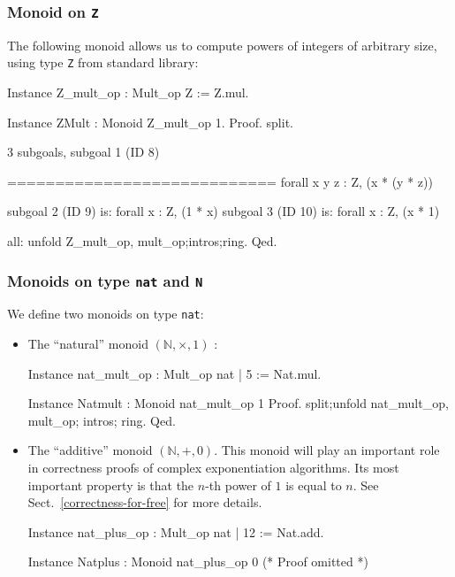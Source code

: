 \subsubsection{Monoid on \texttt{Z}}
The following monoid allows us to compute powers of integers of arbitrary size, 
using type \texttt{Z} from standard library:

\begin{Coqsrc}
Instance Z_mult_op : Mult_op Z := Z.mul.

Instance ZMult : Monoid  Z_mult_op 1.
Proof. 
  split.
\end{Coqsrc}

\begin{Coqanswer}
3 subgoals, subgoal 1 (ID 8)
  
  ============================
   forall x y z : Z, (x * (y * z))%

subgoal 2 (ID 9) is:
 forall x : Z, (1 * x)%
subgoal 3 (ID 10) is:
 forall x : Z, (x * 1)%
\end{Coqanswer}

\begin{Coqsrc}
    all: unfold Z_mult_op, mult_op;intros;ring.
Qed.
\end{Coqsrc}


\subsubsection{Monoids on type \texttt{nat} and \texttt{N}}
\label{nat-monoids}

We define two monoids on type \texttt{nat}:
\begin{itemize}
\item The ``natural'' monoid $(\mathbb{N},\times, 1)$ :

  \begin{Coqsrc}
Instance nat_mult_op : Mult_op nat | 5 := Nat.mul.

Instance  Natmult : Monoid nat_mult_op  1%
Proof.
   split;unfold nat_mult_op, mult_op; intros; ring.
Qed.
\end{Coqsrc}

\item The ``additive''  monoid $(\mathbb{N},+, 0)$.
This monoid will play an important role in correctness proofs of complex
exponentiation algorithms. Its most important property is that the $n$-th 
power of $1$ is equal to $n$. See Sect.~\vref{correctness-for-free} for more details.

\begin{Coqsrc}
Instance nat_plus_op : Mult_op nat | 12 := Nat.add.

Instance Natplus : Monoid nat_plus_op  0%
(* Proof omitted *)
\end{Coqsrc}
\end{itemize}

